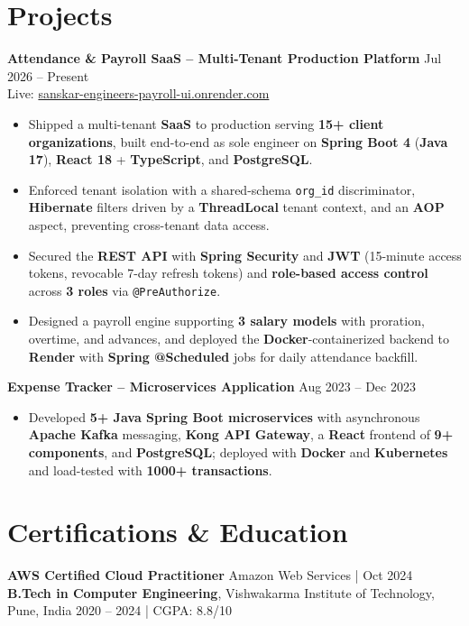 \documentclass[a4paper,10pt]{article}
\begin{document}
\section*{Projects}

\textbf{Attendance \& Payroll SaaS -- Multi-Tenant Production Platform} \hfill Jul 2026 -- Present \\
Live: \href{https://sanskar-engineers-payroll-ui.onrender.com/login}{sanskar-engineers-payroll-ui.onrender.com}
\begin{itemize}[leftmargin=*]
    \item Shipped a multi-tenant \textbf{SaaS} to production serving \textbf{15+ client organizations}, built end-to-end as sole engineer on \textbf{Spring Boot 4} (\textbf{Java 17}), \textbf{React 18} + \textbf{TypeScript}, and \textbf{PostgreSQL}.
    \item Enforced tenant isolation with a shared-schema \texttt{org\_id} discriminator, \textbf{Hibernate} filters driven by a \textbf{ThreadLocal} tenant context, and an \textbf{AOP} aspect, preventing cross-tenant data access.
    \item Secured the \textbf{REST API} with \textbf{Spring Security} and \textbf{JWT} (15-minute access tokens, revocable 7-day refresh tokens) and \textbf{role-based access control} across \textbf{3 roles} via \texttt{@PreAuthorize}.
    \item Designed a payroll engine supporting \textbf{3 salary models} with proration, overtime, and advances, and deployed the \textbf{Docker}-containerized backend to \textbf{Render} with \textbf{Spring @Scheduled} jobs for daily attendance backfill.
\end{itemize}

\textbf{Expense Tracker -- Microservices Application} \hfill Aug 2023 -- Dec 2023
\begin{itemize}[leftmargin=*]
    \item Developed \textbf{5+ Java Spring Boot microservices} with asynchronous \textbf{Apache Kafka} messaging, \textbf{Kong API Gateway}, a \textbf{React} frontend of \textbf{9+ components}, and \textbf{PostgreSQL}; deployed with \textbf{Docker} and \textbf{Kubernetes} and load-tested with \textbf{1000+ transactions}.
\end{itemize}

\section*{Certifications \& Education}
\textbf{AWS Certified Cloud Practitioner} \hfill Amazon Web Services \;|\; Oct 2024 \\
\textbf{B.Tech in Computer Engineering}, Vishwakarma Institute of Technology, Pune, India \hfill 2020 -- 2024 \;|\; CGPA: 8.8/10
\end{document}
